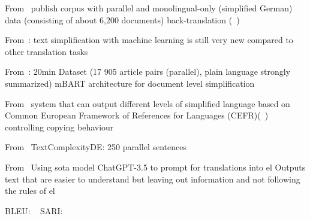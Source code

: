 From~\autocite{battisti-etal-2020-corpus}
publish corpus with parallel and monolingual-only (simplified German) data (consisting of about 6,200 documents)
back-translation (~\autocite{sennrich-etal-2016-improving})

From~\autocite{schomacker2023data}:
text simplification with machine learning is still very new compared to other translation tasks

From~\autocite{rios-etal-2021-new}:
20min Dataset (17 905 article pairs (parallel), plain language strongly summarized)
mBART architecture for document level simplification

From~\autocite{spring-etal-2021-exploring}
system that can output different levels of simplified language based on
Common European Framework of References for Languages (CEFR)(~\autocite{Ansch_tz_2023})
controlling copying behaviour



From~\autocite{naderi2019subjective}
TextComplexityDE: 250 parallel sentences

From~\autocite{deilen2023using}
Using sota model ChatGPT-3.5 to prompt for translations into \gls{el}
Outputs text that are easier to understand but leaving out information and not following the rules of \gls{el}



BLEU: ~\autocite{papineni-etal-2002-bleu}
SARI: ~\autocite{xu-etal-2016-optimizing}